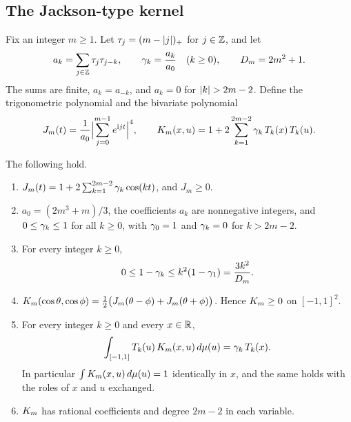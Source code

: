 \subsection{The Jackson-type kernel}\label{sec:ker-kernel}

Fix an integer $m\ge1$. Let $\tau_j=(m-\lvert j\rvert)_+$ for $j\in\mathbb{Z}$, and let
\[
  a_k=\sum_{j\in\mathbb{Z}}\tau_j\tau_{j-k},\qquad
  \gamma_k=\frac{a_k}{a_0}\quad(k\ge0),\qquad
  D_m=2m^2+1 .
\]
The sums are finite, $a_k=a_{-k}$, and $a_k=0$ for $\lvert k\rvert>2m-2$. Define
the trigonometric polynomial and the bivariate polynomial
\begin{equation}\label{eq:ker-kernel}
  J_m(t)=\frac1{a_0}\Bigl\lvert\sum_{j=0}^{m-1}e^{\mathrm{i}jt}\Bigr\rvert^4,
  \qquad
  K_m(x,u)=1+2\sum_{k=1}^{2m-2}\gamma_k\,T_k(x)\,T_k(u).
\end{equation}

\begin{lemma}\label{lem:jackson}
The following hold.
\begin{enumerate}[label=(\alph*)]
\item $J_m(t)=1+2\sum_{k=1}^{2m-2}\gamma_k\cos(kt)$, and $J_m\ge0$.
\item $a_0=(2m^3+m)/3$, the coefficients $a_k$ are nonnegative integers,
  and $0\le\gamma_k\le1$ for all $k\ge0$, with $\gamma_0=1$ and
  $\gamma_k=0$ for $k>2m-2$.
\item For every integer $k\ge0$,
  \begin{equation}\label{eq:ker-damping}
    0\le1-\gamma_k\le k^2(1-\gamma_1)=\frac{3k^2}{D_m}.
  \end{equation}
\item $K_m(\cos\theta,\cos\phi)=\tfrac12\bigl(J_m(\theta-\phi)+J_m(\theta+\phi)\bigr)$.
  Hence $K_m\ge0$ on $[-1,1]^2$.
\item For every integer $k\ge0$ and every $x\in\mathbb{R}$,
  \begin{equation}\label{eq:ker-diagonal}
    \int_{[-1,1]}T_k(u)\,K_m(x,u)\,d\mu(u)=\gamma_k\,T_k(x).
  \end{equation}
  In particular $\int K_m(x,u)\,d\mu(u)=1$ identically in $x$, and the
  same holds with the roles of $x$ and $u$ exchanged.
\item $K_m$ has rational coefficients and degree $2m-2$ in each variable.
\end{enumerate}
\end{lemma}

